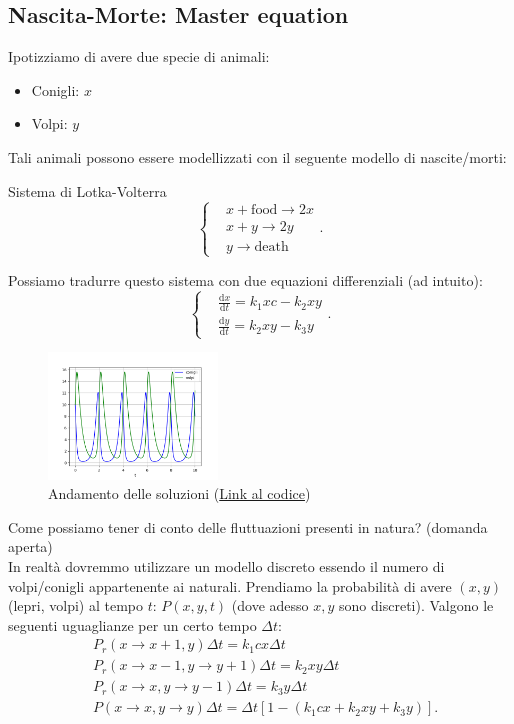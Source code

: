 \subsection{Nascita-Morte: Master equation}%
Ipotizziamo di avere due specie di animali:
\begin{itemize}
    \item Conigli: $x$ 
    \item Volpi: $y$ 
\end{itemize}
Tali animali possono essere modellizzati con il seguente modello di nascite/morti:
\begin{greenbox}{Sistema di Lotka-Volterra}
 \[
    \begin{cases}
	&x+\text{food}\to 2x\\
	&x+y\to 2y\\
	&y\to \text{death}
    \end{cases}
.\]    
\end{greenbox}
\noindent
Possiamo tradurre questo sistema con due equazioni differenziali (ad intuito):
\[
    \begin{cases}
	&\frac{\text{d} x}{\text{d} t} =k_1xc-k_2xy\\
	&\frac{\text{d} y}{\text{d} t} = k_2xy-k_3y
    \end{cases}
.\] 
\begin{figure}[H]
    \centering
    \includegraphics[width=0.4\textwidth]{figures/Volpi-Conigli.png}
\caption{\scriptsize Andamento delle soluzioni (\href{https://github.com/dodogabrie/Sistemi-Complessi/blob/master/python-project/lezione1/volpi_conigli.py}{Link al codice})}
    \label{fig:conigli}
\end{figure}
\noindent
Come possiamo tener di conto delle fluttuazioni presenti in natura? (domanda aperta)\\
In realtà dovremmo utilizzare un modello discreto essendo il numero di volpi/conigli appartenente ai naturali. Prendiamo la probabilità di avere $(x,y)$ (lepri, volpi) al tempo $t$: $P(x,y,t)$ (dove adesso $x,y$ sono discreti). Valgono le seguenti uguaglianze per un certo tempo $\Delta t$:
\[\begin{aligned}
    &P_r(x\to x+1, y) \Delta t = k_1 c x \Delta t\\
    &P_r(x\to x-1, y \to y+1) \Delta t  = k_2xy\Delta t\\
    &P_r(x\to x,y\to y-1) \Delta t = k_3 y \Delta t\\
    &P(x\to x,y\to y) \Delta t = \Delta t \left[  1 - \left(k_1cx+ k_2xy + k_3 y\right)\right]
.\end{aligned}\]
